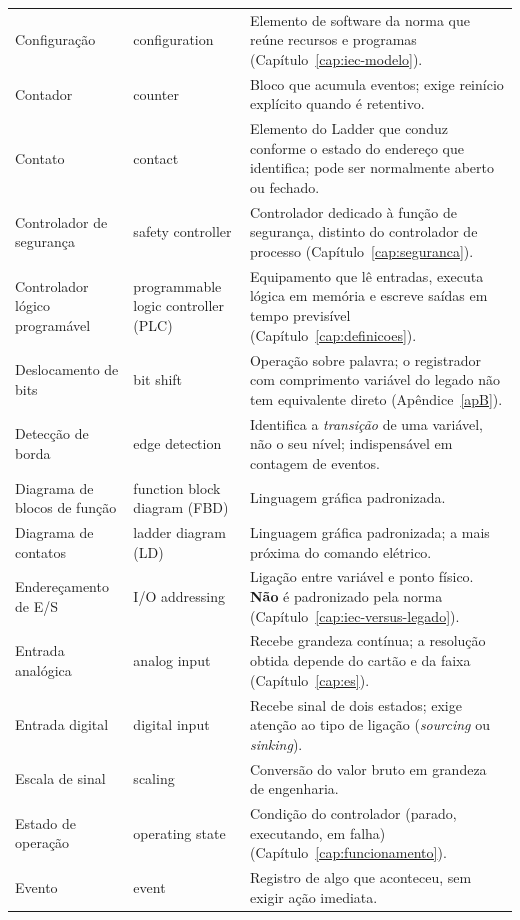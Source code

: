 \begin{longtable}{p{3.3cm} p{3.3cm} p{8.4cm}}
  Configuração & configuration & Elemento de software da norma que reúne recursos e programas
    (Capítulo~\ref{cap:iec-modelo}). \\
  Contador & counter & Bloco que acumula eventos; exige reinício explícito quando é retentivo. \\
  Contato & contact & Elemento do Ladder que conduz conforme o estado do endereço que identifica;
    pode ser normalmente aberto ou fechado. \\
  Controlador de segurança & safety controller & Controlador dedicado à função de segurança, distinto
    do controlador de processo (Capítulo~\ref{cap:seguranca}). \\
  Controlador lógico programável & programmable logic controller (PLC) & Equipamento que lê entradas,
    executa lógica em memória e escreve saídas em tempo previsível
    (Capítulo~\ref{cap:definicoes}). \\
  Deslocamento de bits & bit shift & Operação sobre palavra; o registrador com comprimento variável do
    legado não tem equivalente direto (Apêndice~\ref{apB}). \\
  Detecção de borda & edge detection & Identifica a \emph{transição} de uma variável, não o seu
    nível; indispensável em contagem de eventos. \\
  Diagrama de blocos de função & function block diagram (FBD) & Linguagem gráfica padronizada. \\
  Diagrama de contatos & ladder diagram (LD) & Linguagem gráfica padronizada; a mais próxima do
    comando elétrico. \\
  Endereçamento de E/S & I/O addressing & Ligação entre variável e ponto físico. \textbf{Não} é
    padronizado pela norma (Capítulo~\ref{cap:iec-versus-legado}). \\
  Entrada analógica & analog input & Recebe grandeza contínua; a resolução obtida depende do cartão e
    da faixa (Capítulo~\ref{cap:es}). \\
  Entrada digital & digital input & Recebe sinal de dois estados; exige atenção ao tipo de ligação
    (\emph{sourcing} ou \emph{sinking}). \\
  Escala de sinal & scaling & Conversão do valor bruto em grandeza de engenharia. \\
  Estado de operação & operating state & Condição do controlador (parado, executando, em falha)
    (Capítulo~\ref{cap:funcionamento}). \\
  Evento & event & Registro de algo que aconteceu, sem exigir ação imediata. \\

\end{longtable}
